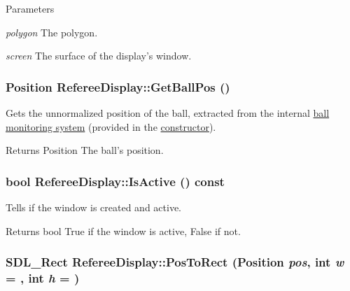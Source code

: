 \begin{DoxyParams}{Parameters}
\item[{\em polygon}]The polygon. \item[{\em screen}]The surface of the display's window. \end{DoxyParams}
\hypertarget{classRefereeDisplay_afa7601bcd5b6361398f48f2fb1d6ead4}{
\subsubsection[{GetBallPos}]{\setlength{\rightskip}{0pt plus 5cm}Position RefereeDisplay::GetBallPos ()}}
\label{classRefereeDisplay_afa7601bcd5b6361398f48f2fb1d6ead4}


Gets the unnormalized position of the ball, extracted from the internal \hyperlink{classBallMonitor}{ball monitoring system} (provided in the \hyperlink{classRefereeDisplay_a8f7d4872a24b44b96a36a5bbf991f5d2}{constructor}). 

\begin{DoxyReturn}{Returns}
Position The ball's position. 
\end{DoxyReturn}
\hypertarget{classRefereeDisplay_a216bbade42b7c7694f69d73c35620fc6}{
\subsubsection[{IsActive}]{\setlength{\rightskip}{0pt plus 5cm}bool RefereeDisplay::IsActive () const}}
\label{classRefereeDisplay_a216bbade42b7c7694f69d73c35620fc6}


Tells if the window is created and active. 

\begin{DoxyReturn}{Returns}
bool True if the window is active, False if not. 
\end{DoxyReturn}
\hypertarget{classRefereeDisplay_a56d7e17a5fb16cbe64fb7ef3e4f28af0}{
\subsubsection[{PosToRect}]{\setlength{\rightskip}{0pt plus 5cm}SDL\_\-Rect RefereeDisplay::PosToRect (Position {\em pos}, \/  int {\em w} = {}, \/  int {\em h} = {})}}
\label{classRefereeDisplay_a56d7e17a5fb16cbe64fb7ef3e4f28af0}


